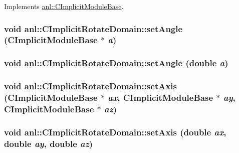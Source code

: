 Implements \hyperlink{classanl_1_1CImplicitModuleBase_ab88f8a1822dcfbc13ba5230318b0acd1}{anl::CImplicitModuleBase}.\hypertarget{classanl_1_1CImplicitRotateDomain_a3b93250d577c8350ddc8381e494605fb}{
\subsubsection[{setAngle}]{\setlength{\rightskip}{0pt plus 5cm}void anl::CImplicitRotateDomain::setAngle ({\bf CImplicitModuleBase} $\ast$ {\em a})}}
\label{classanl_1_1CImplicitRotateDomain_a3b93250d577c8350ddc8381e494605fb}
\hypertarget{classanl_1_1CImplicitRotateDomain_a8bee0c761cbf7920b6fd2cb42fb2b38f}{
\subsubsection[{setAngle}]{\setlength{\rightskip}{0pt plus 5cm}void anl::CImplicitRotateDomain::setAngle (double {\em a})}}
\label{classanl_1_1CImplicitRotateDomain_a8bee0c761cbf7920b6fd2cb42fb2b38f}
\hypertarget{classanl_1_1CImplicitRotateDomain_a5e77155db0000d4f97a0c63fb658af10}{
\subsubsection[{setAxis}]{\setlength{\rightskip}{0pt plus 5cm}void anl::CImplicitRotateDomain::setAxis ({\bf CImplicitModuleBase} $\ast$ {\em ax}, \/  {\bf CImplicitModuleBase} $\ast$ {\em ay}, \/  {\bf CImplicitModuleBase} $\ast$ {\em az})}}
\label{classanl_1_1CImplicitRotateDomain_a5e77155db0000d4f97a0c63fb658af10}
\hypertarget{classanl_1_1CImplicitRotateDomain_ae30695e1ea7d8b089bb446c175f57e4f}{
\subsubsection[{setAxis}]{\setlength{\rightskip}{0pt plus 5cm}void anl::CImplicitRotateDomain::setAxis (double {\em ax}, \/  double {\em ay}, \/  double {\em az})}}
